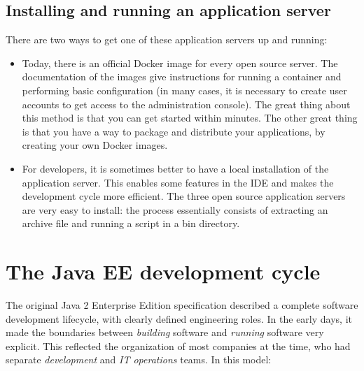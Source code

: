 \subsection{Installing and running an application server}

There are two ways to get one of these application servers up and running:


\begin{itemize}
\item Today, there is an official Docker image for every open source server. The documentation of the images give instructions for running a container and performing basic configuration (in many cases, it is necessary to create user accounts to get access to the administration console). The great thing about this method is that you can get started within minutes. The other great thing is that you have a way to package and distribute your applications, by creating your own Docker images.
\item For developers, it is sometimes better to have a local installation of the application server. This enables some features in the IDE and makes the development cycle more efficient. The three open source application servers are very easy to install: the process essentially consists of extracting an archive file and running a script in a bin directory.
\end{itemize}


\section{The Java EE development cycle}


The original Java 2 Enterprise Edition specification described a complete software development lifecycle, with clearly defined engineering roles. In the early days, it made the boundaries between \emph{building} software and \emph{running} software very explicit. This reflected the organization of most companies at the time, who had separate \emph{development} and \emph{IT operations} teams. In this model:

